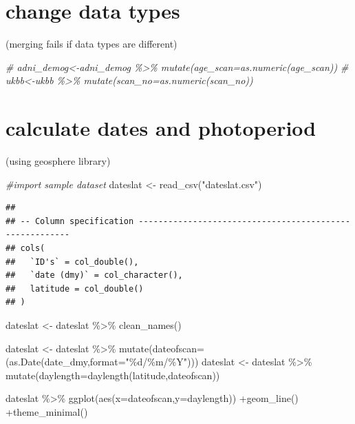 \documentclass[
]{book}
\newenvironment{Shaded}{\begin{snugshade}}{\end{snugshade}}
\newcommand{\AttributeTok}[1]{\textcolor[rgb]{0.77,0.63,0.00}{#1}}
\newcommand{\CommentTok}[1]{\textcolor[rgb]{0.56,0.35,0.01}{\textit{#1}}}
\newcommand{\FunctionTok}[1]{\textcolor[rgb]{0.00,0.00,0.00}{#1}}
\newcommand{\NormalTok}[1]{#1}
\newcommand{\OtherTok}[1]{\textcolor[rgb]{0.56,0.35,0.01}{#1}}
\newcommand{\SpecialCharTok}[1]{\textcolor[rgb]{0.00,0.00,0.00}{#1}}
\newcommand{\StringTok}[1]{\textcolor[rgb]{0.31,0.60,0.02}{#1}}
\begin{document}
\hypertarget{change-data-types}{%
\section{change data types}\label{change-data-types}}

(merging fails if data types are different)

\begin{Shaded}
\begin{Highlighting}[]
\CommentTok{\# adni\_demog\textless{}{-}adni\_demog \%\textgreater{}\% mutate(age\_scan=as.numeric(age\_scan))}
\CommentTok{\# ukbb\textless{}{-}ukbb \%\textgreater{}\% mutate(scan\_no=as.numeric(scan\_no))}
\end{Highlighting}
\end{Shaded}

\hypertarget{calculate-dates-and-photoperiod}{%
\section{calculate dates and photoperiod}\label{calculate-dates-and-photoperiod}}

(using geosphere library)

\begin{Shaded}
\begin{Highlighting}[]
\CommentTok{\#import sample dataset}
\NormalTok{dateslat }\OtherTok{\textless{}{-}} \FunctionTok{read\_csv}\NormalTok{(}\StringTok{"dateslat.csv"}\NormalTok{)}
\end{Highlighting}
\end{Shaded}

\begin{verbatim}
## 
## -- Column specification --------------------------------------------------------
## cols(
##   `ID's` = col_double(),
##   `date (dmy)` = col_character(),
##   latitude = col_double()
## )
\end{verbatim}

\begin{Shaded}
\begin{Highlighting}[]
\NormalTok{dateslat }\OtherTok{\textless{}{-}}\NormalTok{ dateslat }\SpecialCharTok{\%\textgreater{}\%}
  \FunctionTok{clean\_names}\NormalTok{()}

\NormalTok{dateslat }\OtherTok{\textless{}{-}}\NormalTok{ dateslat }\SpecialCharTok{\%\textgreater{}\%} \FunctionTok{mutate}\NormalTok{(}\AttributeTok{dateofscan=}\NormalTok{(}\FunctionTok{as.Date}\NormalTok{(date\_dmy,}\AttributeTok{format=}\StringTok{"\%d/\%m/\%Y"}\NormalTok{)))}
\NormalTok{dateslat }\OtherTok{\textless{}{-}}\NormalTok{ dateslat }\SpecialCharTok{\%\textgreater{}\%} \FunctionTok{mutate}\NormalTok{(}\AttributeTok{daylength=}\FunctionTok{daylength}\NormalTok{(latitude,dateofscan))}
                                
\NormalTok{dateslat }\SpecialCharTok{\%\textgreater{}\%} \FunctionTok{ggplot}\NormalTok{(}\FunctionTok{aes}\NormalTok{(}\AttributeTok{x=}\NormalTok{dateofscan,}\AttributeTok{y=}\NormalTok{daylength)) }\SpecialCharTok{+}\FunctionTok{geom\_line}\NormalTok{() }\SpecialCharTok{+}\FunctionTok{theme\_minimal}\NormalTok{()}
\end{Highlighting}
\end{Shaded}
\end{document}
